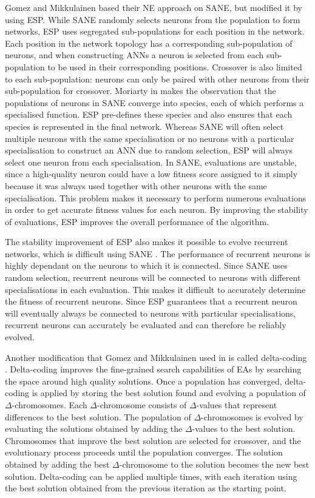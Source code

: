 \documentclass[12pt]{article} %
\begin{document}
Gomez and Mikkulainen based their NE approach on SANE, but modified it by using ESP. While SANE randomly selects neurons from the population to form networks, ESP uses segregated sub-populations for each position in the network. Each position in the network topology has a corresponding sub-population of neurons, and when constructing ANNs a neuron is selected from each sub-population to be used in their corresponding positions. Crossover is also limited to each sub-population: neurons can only be paired with other neurons from their sub-population for crossover. Moriarty in \cite{Moriarty1997} makes the observation that the populations of neurons in SANE converge into species, each of which performs a specialised function. ESP pre-defines these species and also ensures that each species is represented in the final network. Whereas SANE will often select multiple neurons with the same specialisation or no neurons with a particular specialisation to construct an ANN due to random selection, ESP will always select one neuron from each specialisation. In SANE, evaluations are unstable, since a high-quality neuron could have a low fitness score assigned to it simply because it was always used together with other neurons with the same specialisation. This problem makes it necessary to perform numerous evaluations in order to get accurate fitness values for each neuron. By improving the stability of evaluations, ESP improves the overall performance of the algorithm.

The stability improvement of ESP also makes it possible to evolve recurrent networks, which is difficult using SANE \cite{Gomez1997}. The performance of recurrent neurons is highly dependant on the neurons to which it is connected. Since SANE uses random selection, recurrent neurons will be connected to neurons with different specialisations in each evaluation. This makes it difficult to accurately determine the fitness of recurrent neurons. Since ESP guarantees that a recurrent neuron will eventually always be connected to neurons with particular specialisations, recurrent neurons can accurately be evaluated and can therefore be reliably evolved.

Another modification that Gomez and Mikkulainen used in \cite{Gomez1997} is called delta-coding \cite{Whitley1991}. Delta-coding improves the fine-grained search capabilities of EAs by searching the space around high quality solutions. Once a population has converged, delta-coding is applied by storing the best solution found and evolving a population of $\Delta$-chromosomes. Each $\Delta$-chromosome consists of $\Delta$-values that represent differences to the best solution. The population of $\Delta$-chromosomes is evolved by evaluating the solutions obtained by adding the $\Delta$-values to the best solution. Chromosomes that improve the best solution are selected for crossover, and the evolutionary process proceeds until the population converges. The solution obtained by adding the best $\Delta$-chromosome to the solution becomes the new best solution. Delta-coding can be applied multiple times, with each iteration using the best solution obtained from the previous iteration as the starting point.
\end{document}
